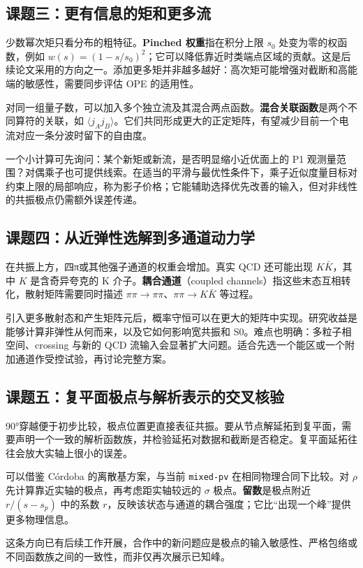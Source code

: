 \documentclass[UTF8,a4paper,11pt,fontset=fandol]{ctexart}
\numberwithin{equation}{section}
\newcommand{\code}[1]{{\urlstyle{tt}\nolinkurl{#1}}}
\begin{document}
\subsection{课题三：更有信息的矩和更多流}
少数幂次矩只看分布的粗特征。\textbf{Pinched 权重}指在积分上限 \(s_0\) 处变为零的权函数，例如 \(w(s)=(1-s/s_0)^2\)；它可以降低靠近时类端点区域的贡献。这是后续论文采用的方向之一。添加更多矩并非越多越好：高次矩可能增强对截断和高能端的敏感性，需要同步评估 OPE 的适用性。

对同一组量子数，可以加入多个独立流及其混合两点函数。\textbf{混合关联函数}是两个不同算符的关联，如 \(\langle j_Aj_B\rangle\)。它们共同形成更大的正定矩阵，有望减少目前一个电流对应一条分波时留下的自由度。

一个小计算可先询问：某个新矩或新流，是否明显缩小近优面上的 P1 观测量范围？对偶乘子也可提供线索。在适当的平滑与最优性条件下，乘子近似度量目标对约束上限的局部响应，称为影子价格；它能辅助选择优先改善的输入，但对非线性的共振极点仍需额外误差传递。

\subsection{课题四：从近弹性选解到多通道动力学}
在共振上方，四π或其他强子通道的权重会增加。真实 QCD 还可能出现 \(K\bar K\)，其中 \(K\) 是含奇异夸克的 K 介子。\textbf{耦合通道}（coupled channels）指这些末态互相转化，散射矩阵需要同时描述 \(\pi\pi\to\pi\pi\)、\(\pi\pi\to K\bar K\) 等过程。

引入更多散射态和产生矩阵元后，概率守恒可以在更大的矩阵中实现。研究收益是能够计算非弹性从何而来，以及它如何影响宽共振和 S0。难点也明确：多粒子相空间、crossing 与新的 QCD 流输入会显著扩大问题。适合先选一个能区或一个附加通道作受控试验，再讨论完整方案。

\subsection{课题五：复平面极点与解析表示的交叉核验}
90°穿越便于初步比较，极点位置更直接表征共振。要从节点解延拓到复平面，需要声明一个一致的解析函数族，并检验延拓对数据和截断是否稳定。复平面延拓往往会放大实轴上很小的误差。

可以借鉴 Córdoba 的离散基方案，与当前 \code{mixed-pv} 在相同物理合同下比较。对 \(\rho\) 先计算靠近实轴的极点，再考虑距实轴较远的 \(\sigma\) 极点。\textbf{留数}是极点附近 \(r/(s-s_p)\) 中的系数 \(r\)，反映该状态与通道的耦合强度；它比“出现一个峰”提供更多物理信息。

这条方向已有后续工作开展，合作中的新问题应是极点的输入敏感性、严格包络或不同函数族之间的一致性，而非仅再次展示已知峰。
\end{document}
